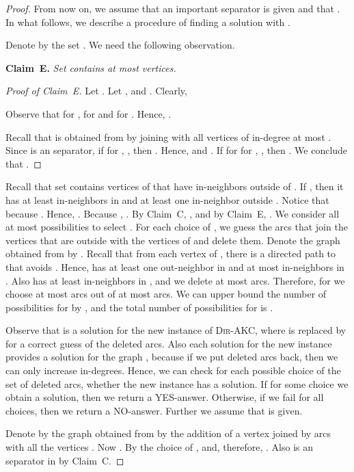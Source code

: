 \documentclass[11pt,a4paper]{article}
\newcommand{\DAKC}{\textsc{Dir-AKC}\xspace}
\begin{document}
\begin{proof}
\medskip
From now on, we assume that an important  separator  is given and that  .
In what follows, we describe a procedure of finding  a solution with  .


\medskip
Denote by  the set . We need the following observation.



\medskip
\noindent
{\bf Claim~E.} {\it
Set  contains at most  vertices.
}


\begin{proof}[Proof of Claim~E]
Let . Let ,  and
. Clearly,

Observe that  for ,   for  and 
for . Hence, .

Recall that  is obtained from  by joining  with all vertices of in-degree at most . Since  is an 
separator, if for , , then . Hence,  and .
If for for , , then . We conclude that .
\end{proof}

Recall   that  set  contains vertices of  that have in-neighbors outside of . If , then it has at least  in-neighbors in  and at least one in-neighbor outside . Notice that
 because . Hence, . Because ,
. By Claim~C, , and by
Claim~E, .
We consider  all at most
 possibilities to select  . For each choice of
, we guess the arcs that join the vertices that are outside  with the vertices of
 and delete them. Denote the graph obtained from  by . Recall that from each vertex  of
, there is a directed path to  that avoids . Hence,  has at least one out-neighbor in 
and at most  in-neighbors in . Also  has at least  in-neighbors in , and we delete at most 
arcs. Therefore, for  we choose at most  arcs out of at most  arcs. We can upper bound the number of
possibilities for  by , and the total number of possibilities for  is
.

Observe that  is a solution for the new instance of \DAKC, where  is replaced by  for a correct guess of the
deleted arcs. Also each solution for the new instance provides a solution for the graph , because if we put deleted arcs
back, then we can only increase in-degrees. Hence, we can check for each possible choice of the set of deleted arcs, whether
the new instance has a solution. If for some choice we obtain a solution, then we return a YES-answer. Otherwise, if we fail
for all choices, then we return a NO-answer. Further we assume that  is given.


Denote by  the graph obtained from  by the addition of a vertex  joined by arcs with all the vertices .
Now . By the choice of ,
 and, therefore, . Also  is an  separator in
 by Claim~C.


\end{proof}
\end{document}
